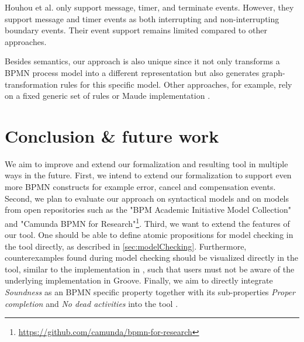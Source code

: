 \documentclass[adraft, copyright, creativecommons]{eptcs} %
\begin{document}
Houhou et al. \cite{houhouFirstOrderLogicVerification2022} only support message, timer, and terminate events.
However, they support message and timer events as both interrupting and non-interrupting boundary events.
Their event support remains limited compared to other approaches.




Besides semantics, our approach is also unique since it not only transforms a BPMN process model into a different representation but also generates graph-transformation rules for this specific model.
Other approaches, for example, rely on a fixed generic set of rules \cite{vangorpVisualTokenbasedFormalization2013} or Maude implementation \cite{corradiniFormalApproachAnalysis2021}.
\section{Conclusion \& future work} \label{sec:conclusion}

We aim to improve and extend our formalization and resulting tool in multiple ways in the future.
First, we intend to extend our formalization to support even more BPMN constructs for example error, cancel and compensation events.
Second, we plan to evaluate our approach on syntactical models and on models from open repositories such as the "BPM Academic Initiative Model Collection" \cite{weskeModelCollectionBusiness2020} and "Camunda BPMN for
Research"\footnote{\url{https://github.com/camunda/bpmn-for-research}}.
Third, we want to extend the features of our tool.
One should be able to define atomic propositions for model checking in the tool directly, as described in \cref{sec:modelChecking}.
Furthermore, counterexamples found during model checking should be visualized directly in the tool, similar to the implementation in \cite{houhouFirstOrderLogicVerification2022}, such that users must not be aware of the underlying implementation in Groove.
Finally, we aim to directly integrate \emph{Soundness} as an BPMN specific property together with its sub-properties \emph{Proper completion} and \emph{No dead activities} into the tool \cite{corradiniClassificationBPMNCollaborations2018}.

\end{document}
